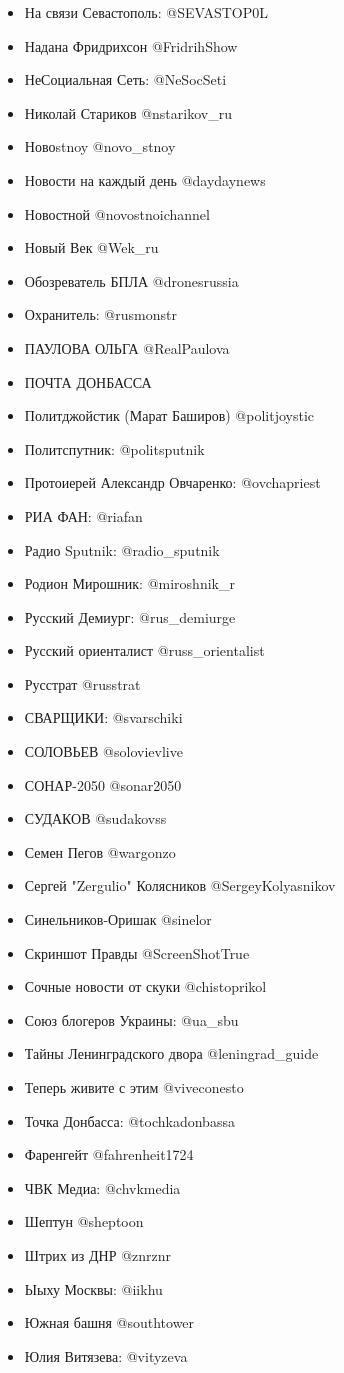 \begin{itemize}
\item На связи Севастополь: @SEVASTOP0L
\item Надана Фридрихсон @FridrihShow 
\item НеСоциальная Сеть: @NeSocSeti
\item Николай Стариков @nstarikov\_ru
\item Новоstnoy @novo\_stnoy
\item Новости на каждый день @daydaynews
\item Новостной @novostnoichannel
\item Новый Век @Wek\_ru
\item Обозреватель БПЛА @dronesrussia
\item Охранитель: @rusmonstr
\item ПАУЛОВА ОЛЬГА @RealPaulova  
\item ПОЧТА ДОНБАССА 
\item Политджойстик (Марат Баширов) @politjoystic
\item Политспутник: @politsputnik
\item Протоиерей Александр Овчаренко: @ovchapriest
\item РИА ФАН: @riafan
\item Радио Sputnik: @radio\_sputnik
\item Родион Мирошник: @miroshnik\_r 
\item Русский Демиург: @rus\_demiurge
\item Русский ориенталист @russ\_orientalist
\item Русстрат @russtrat
\item СВАРЩИКИ: @svarschiki
\item СОЛОВЬЕВ @solovievlive
\item СОНАР-2050 @sonar2050
\item СУДАКОВ @sudakovss
\item Семен Пегов @wargonzo 
\item Сергей "Zergulio" Колясников @SergeyKolyasnikov 
\item Синельников-Оришак @sinelor
\item Скриншот Правды @ScreenShotTrue
\item Сочные новости от скуки @chistoprikol
\item Союз блогеров Украины: @ua\_sbu 
\item Тайны Ленинградского двора @leningrad\_guide
\item Теперь живите с этим @viveconesto
\item Точка Донбасса: @tochkadonbassa
\item Фаренгейт @fahrenheit1724
\item ЧВК Медиа: @chvkmedia
\item Шептун @sheptoon
\item Штрих из ДНР @znrznr 
\item Ыыху Москвы: @iikhu
\item Южная башня @southtower
\item Юлия Витязева: @vityzeva
\end{itemize}

